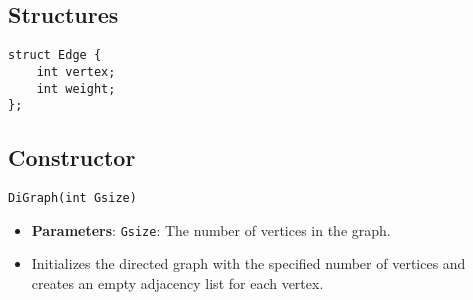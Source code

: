 \documentclass{article}
\begin{document}
\subsection{Structures}
\begin{verbatim}
struct Edge {
    int vertex;
    int weight;
};
\end{verbatim}

\subsection{Constructor}
\begin{verbatim}
DiGraph(int Gsize)
\end{verbatim}
\begin{itemize}
    \item \textbf{Parameters}: \texttt{Gsize}: The number of vertices in the graph.
    \item Initializes the directed graph with the specified number of vertices and creates an empty adjacency list for each vertex.
\end{itemize}
\end{document}

